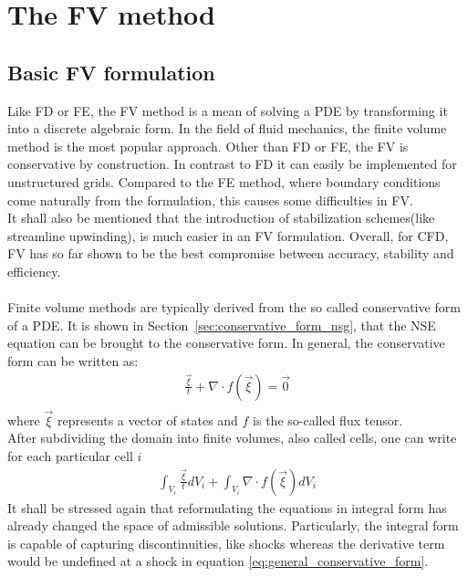 \documentclass[../main.tex]{subfiles}
\begin{document}
\setlength{\delimitershortfall}{0pt}


\chapter{The \acl{FV} method}\label{sec:finite_volume_method}
\minitoc

\section{Basic \acl{FV} formulation}\label{sec:basic_fv}
Like \ac{FD} or \acf{FE}, the \acf{FV} method is a mean of solving a \ac{PDE} by transforming it into a discrete algebraic form. In the field of fluid mechanics, the finite volume method is the most popular approach. Other than \ac{FD} or \ac{FE}, the \ac{FV} is conservative by construction. In contrast to \ac{FD} it can easily be implemented for unstructured grids. Compared to the \ac{FE} method, where boundary conditions come naturally from the formulation, this causes some difficulties in \ac{FV}.\\
It shall also be mentioned that the introduction of stabilization schemes(like streamline upwinding), is much easier in an \ac{FV} formulation.
Overall, for \ac{CFD}, \ac{FV} has so far shown to be the best compromise between accuracy, stability and efficiency.
 \\
 \\
Finite volume methods are typically derived from the so called conservative form of a \ac{PDE}. It is shown in Section~\ref{sec:conservative_form_nsg}, that the \ac{NSE} equation can be  brought to the conservative form. In general, the conservative form can be written as:
\begin{align}\label{eq:general_conservative_form}
\tfrac{\vec{\xi}}{t}+\nabla\cdot f(\vec{\xi}) = \vec{0} \\
\end{align}
where $\vec{\xi}$ represents a vector of states and $f$ is the so-called flux tensor.\\
After subdividing the domain into finite volumes, also called cells, one can write for each particular cell $i$
\begin{align}
\int_{V_i} \tfrac{\vec{\xi}}{t} dV_i + \int_{V_i} \nabla\cdot f(\vec{\xi}) dV_i
\end{align}
It shall be stressed again that reformulating the equations in integral form has already changed the space of admissible solutions. Particularly, the integral form is capable of capturing discontinuities, like shocks whereas the derivative term would be undefined  at a shock in equation \eqref{eq:general_conservative_form}.
\end{document}
